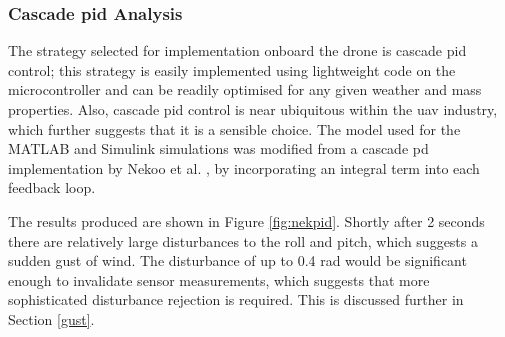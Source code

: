 \subsubsection{Cascade \gls{pid} Analysis}

The strategy selected for implementation onboard the drone is cascade \gls{pid} control; this strategy is easily implemented using lightweight code on the microcontroller and can be readily optimised for any given weather and mass properties. Also, cascade \gls{pid} control is near ubiquitous within the \gls{uav} industry, which further suggests that it is a sensible choice. The model used for the MATLAB and Simulink simulations was modified from a cascade \gls{pd} implementation by Nekoo et al. \cite{nekoo}, by incorporating an integral term into each feedback loop.

The results produced are shown in Figure \ref{fig:nekpid}. Shortly after 2 seconds there are relatively large disturbances to the roll and pitch, which suggests a sudden gust of wind. The disturbance of up to 0.4 rad would be significant enough to invalidate sensor measurements, which suggests that more sophisticated disturbance rejection is required. This is discussed further in Section \ref{gust}. 




